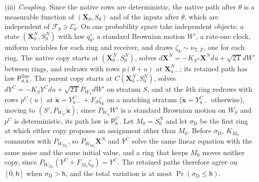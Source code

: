 (iii) \emph{Coupling.} Since the native rows are deterministic, the native
path after \(\theta\) is a measurable function of
\((\mathbf X_\theta,S_\theta)\) and of the inputs after \(\theta\), which are
independent of \(\mathcal F_\theta\ni\mathscr E^\circ_\theta\). On one
probability space take independent objects: a state
\((\mathbf X^N_0,S^N_0)\) with law \(q^\circ_\theta\), a standard Brownian
motion \(W'\), a rate-one clock, uniform variables for each ring and receiver,
and draws \(\zeta_k\sim\nu_{\mathrm T,Z}\), one for each ring. The native copy
starts at \((\mathbf X^N_0,S^N_0)\), solves
\(d\mathbf X^N=-K_{S^N}\mathbf X^Ndu+\sqrt{2\mathrm T}dW'\) between rings, and
redraws with rows \(p(\theta+u)\) at \(\mathbf X^N_{u-}\); its retained path
has law \(\mathsf P^{\mathrm{fine}}_{\theta,\mathsf h}\). The parent copy
starts at \(C(\mathbf X^N_0,S^N_0)\), solves
\(dY^C=-K_SY^Cdu+\sqrt{2\mathrm T}P_{W_S}dW'\) on stratum \(S\), and at the
\(k\)th ring redraws with rows \(p^C(u)\) at
\(\widetilde{\mathbf x}=Y^C_{u-}+F_S\zeta_k\) on a matching stratum
(\(\widetilde{\mathbf x}=Y^C_{u-}\) otherwise), moving to
\((S',P_{W_{S'}}\widetilde{\mathbf x})\); since \(P_{W_S}W'\) is a standard
Brownian motion on \(W_S\) and \(p^C\) is deterministic, its path law is
\(\mathsf P^C_{\mathsf h}\). Let \(M_0=S^N_0\) and let \(\sigma_{\mathrm D}\)
be the first ring at which either copy proposes an assignment other than
\(M_0\). Before \(\sigma_{\mathrm D}\), \(K_{M_0}\) commutes with
\(P_{W_{M_0}}\), so \(P_{W_{M_0}}\mathbf X^N\) and \(Y^C\) solve the same
linear equation with the same noise and the same initial value, and a ring
that keeps \(M_0\) moves neither copy, since
\(P_{W_{M_0}}(Y^C+F_{M_0}\zeta_k)=Y^C\). The retained paths therefore agree on
\([0,\mathsf h]\) when \(\sigma_{\mathrm D}>\mathsf h\), and the total
variation is at most \(\Pr(\sigma_{\mathrm D}\le\mathsf h)\).

